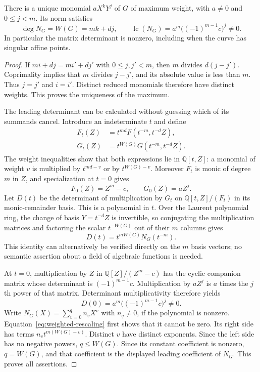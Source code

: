 \begin{theorem}\label{thm:weighted-norm-degree}
There is a unique monomial $aX^kY^j$ of $G$ of maximum weight, with
$a\ne0$ and $0\le j<m$.  Its norm satisfies
\[
 \deg N_G=W(G)=mk+dj,
 \qquad
 \operatorname{lc}(N_G)
   =a^m\bigl((-1)^{m-1}c\bigr)^j\ne0.
\]
In particular the matrix determinant is nonzero, including when the curve
has singular affine points.
\end{theorem}

\begin{proof}
If $mi+dj=mi'+dj'$ with $0\le j,j'<m$, then $m$ divides
$d(j-j')$.  Coprimality implies that $m$ divides $j-j'$, and its absolute
value is less than $m$.  Thus $j=j'$ and $i=i'$.  Distinct reduced
monomials therefore have distinct weights.  This proves the uniqueness
of the maximum.

The leading determinant can be calculated without guessing which of its
summands cancel.  Introduce an indeterminate $t$ and define
\begin{align*}
 F_t(Z)&=t^{md}F(t^{-m},t^{-d}Z),\\
 G_t(Z)&=t^{W(G)}G(t^{-m},t^{-d}Z).
\end{align*}
The weight inequalities show that both expressions lie in
$\mathbb Q[t,Z]$: a monomial of weight $v$ is multiplied by
$t^{md-v}$ or by $t^{W(G)-v}$.  Moreover $F_t$ is monic of degree $m$
in $Z$, and specialization at $t=0$ gives
\[
 F_0(Z)=Z^m-c,\qquad G_0(Z)=aZ^j.
\]
Let $D(t)$ be the determinant of multiplication by $G_t$ on
$\mathbb Q[t,Z]/(F_t)$ in its monic-remainder basis.  This is a polynomial
in $t$.  Over the Laurent polynomial ring, the change of basis
$Y=t^{-d}Z$ is invertible, so conjugating the multiplication matrices and
factoring the scalar $t^{-W(G)}$ out of their $m$ columns gives
\begin{equation}\label{eq:weighted-rescaling}
 D(t)=t^{mW(G)}N_G(t^{-m}).
\end{equation}
This identity can alternatively be verified directly on the $m$ basis
vectors; no semantic assertion about a field of algebraic functions is
needed.

At $t=0$, multiplication by $Z$ in
$\mathbb Q[Z]/(Z^m-c)$ has the cyclic companion matrix whose determinant
is $(-1)^{m-1}c$.  Multiplication by $aZ^j$ is $a$ times the $j$th power
of that matrix.  Determinant multiplicativity therefore yields
\[
 D(0)=a^m\bigl((-1)^{m-1}c\bigr)^j\ne0.
\]
Write $N_G(X)=\sum_{v=0}^{q}n_vX^v$ with $n_q\ne0$, if the
polynomial is nonzero.  Equation~\eqref{eq:weighted-rescaling} first
shows that it cannot be zero.  Its right side has terms
$n_vt^{m(W(G)-v)}$.  Distinct $v$ have distinct exponents.  Since the
left side has no negative powers, $q\le W(G)$.  Since its constant
coefficient is nonzero, $q=W(G)$, and that coefficient is the displayed
leading coefficient of $N_G$.  This proves all assertions.
\end{proof}


